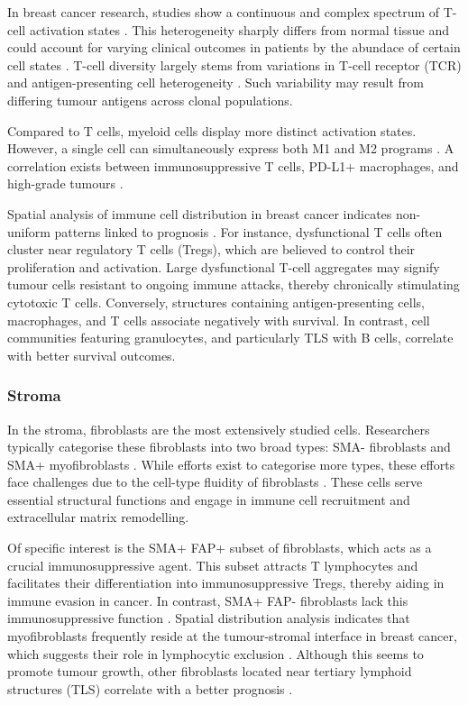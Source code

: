 In breast cancer research, studies show a continuous and complex spectrum of T-cell activation states \parencite{Azizi2018-vc}. This heterogeneity sharply differs from normal tissue and could account for varying clinical outcomes in patients by the abundace of certain cell states \parencite{Azizi2018-vc,Savas2018-vb}. T-cell diversity largely stems from variations in T-cell receptor (TCR) and antigen-presenting cell heterogeneity \parencite{Azizi2018-vc}. Such variability may result from differing tumour antigens across clonal populations.

Compared to T cells, myeloid cells display more distinct activation states. However, a single cell can simultaneously express both M1 and M2 programs \parencite{Azizi2018-vc}. A correlation exists between immunosuppressive T cells, PD-L1+ macrophages, and high-grade tumours \parencite{Wagner2019-zp}.

Spatial analysis of immune cell distribution in breast cancer indicates non-uniform patterns linked to prognosis \parencite{Danenberg2022-zb}. For instance, dysfunctional T cells often cluster near regulatory T cells (Tregs), which are believed to control their proliferation and activation. Large dysfunctional T-cell aggregates may signify tumour cells resistant to ongoing immune attacks, thereby chronically stimulating cytotoxic T cells. Conversely, structures containing antigen-presenting cells, macrophages, and T cells associate negatively with survival. In contrast, cell communities featuring granulocytes, and particularly \acf{TLS} with B cells, correlate with better survival outcomes.

\subsubsection*{Stroma}

In the stroma, fibroblasts are the most extensively studied cells. Researchers typically categorise these fibroblasts into two broad types: SMA- fibroblasts and SMA+ myofibroblasts \parencite{Costa2018-ir}. While efforts exist to categorise more types, these efforts face challenges due to the cell-type fluidity of fibroblasts \parencite{Cords2023-og,Wu2021-uq}. These cells serve essential structural functions and engage in immune cell recruitment and extracellular matrix remodelling.

Of specific interest is the SMA+ FAP+ subset of fibroblasts, which acts as a crucial immunosuppressive agent. This subset attracts T lymphocytes and facilitates their differentiation into immunosuppressive Tregs, thereby aiding in immune evasion in cancer. In contrast, SMA+ FAP- fibroblasts lack this immunosuppressive function \parencite{Costa2018-ir}. Spatial distribution analysis indicates that myofibroblasts frequently reside at the tumour-stromal interface in breast cancer, which suggests their role in lymphocytic exclusion \parencite{Danenberg2022-zb}. Although this seems to promote tumour growth, other fibroblasts located near tertiary lymphoid structures (TLS) correlate with a better prognosis \parencite{Danenberg2022-zb, Cords2023-og}.

